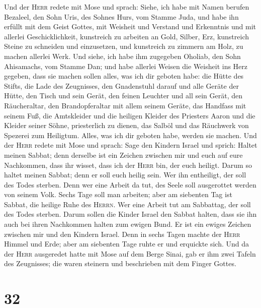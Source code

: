  Und der \textsc{Herr} redete mit Mose und sprach:
 Siehe, ich habe mit Namen berufen Bezaleel, den Sohn
Uris, des Sohnes Hurs, vom Stamme Juda,  und habe ihn
erfüllt mit dem Geist Gottes, mit Weisheit und Verstand und Erkenntnis
und mit allerlei Geschicklichkeit,  kunstreich zu arbeiten
an Gold, Silber, Erz,  kunstreich Steine zu schneiden und
einzusetzen, und kunstreich zu zimmern am Holz, zu machen allerlei Werk.
 Und siehe, ich habe ihm zugegeben Oholiab, den Sohn
Ahisamachs, vom Stamme Dan; und habe allerlei Weisen die Weisheit ins
Herz gegeben, dass sie machen sollen alles, was ich dir geboten habe:
 die Hütte des Stifts, die Lade des Zeugnisses, den
Gnadenstuhl darauf und alle Geräte der Hütte,  den Tisch
und sein Gerät, den feinen Leuchter und all sein Gerät, den
Räucheraltar,  den Brandopferaltar mit allem seinem
Geräte, das Handfass mit seinem Fuß,  die Amtskleider und
die heiligen Kleider des Priesters Aaron und die Kleider seiner Söhne,
priesterlich zu dienen,  das Salböl und das Räuchwerk von
Spezerei zum Heiligtum. Alles, was ich dir geboten habe, werden sie
machen.  Und der \textsc{Herr} redete mit Mose und
sprach:  Sage den Kindern Israel und sprich: Haltet
meinen Sabbat; denn derselbe ist ein Zeichen zwischen mir und euch auf
eure Nachkommen, dass ihr wisset, dass ich der \textsc{Herr} bin, der
euch heiligt.  Darum so haltet meinen Sabbat; denn er
soll euch heilig sein. Wer ihn entheiligt, der soll des Todes sterben.
Denn wer eine Arbeit da tut, des Seele soll ausgerottet werden von
seinem Volk.  Sechs Tage soll man arbeiten; aber am
siebenten Tag ist Sabbat, die heilige Ruhe des \textsc{Herrn}. Wer eine
Arbeit tut am Sabbattag, der soll des Todes sterben. 
Darum sollen die Kinder Israel den Sabbat halten, dass sie ihn auch bei
ihren Nachkommen halten zum ewigen Bund.  Er ist ein
ewiges Zeichen zwischen mir und den Kindern Israel. Denn in sechs Tagen
machte der \textsc{Herr} Himmel und Erde; aber am siebenten Tage ruhte
er und erquickte sich.  Und da der \textsc{Herr}
ausgeredet hatte mit Mose auf dem Berge Sinai, gab er ihm zwei Tafeln
des Zeugnisses; die waren steinern und beschrieben mit dem Finger
Gottes.

\hypertarget{section-31}{%
\section{32}\label{section-31}}

